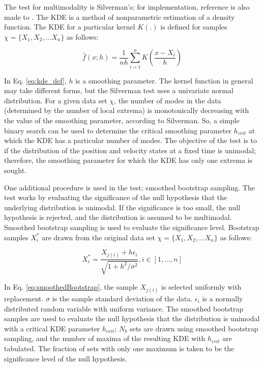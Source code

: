 \documentclass[]{article}
\begin{document}
The test for multimodality is Silverman's\cite{silverman}; for implementation, reference is also made to \cite{adereth}. The KDE is a method of nonparametric estimation of a density function. The KDE for a particular kernel $K(.)$ is defined for samples $\chi = \{ X_1,X_2,...X_n \}$ as follows:

\begin{equation}
\hat{f}(x;h) = \frac{1}{nh} \sum_{i=1}^{n} K(\frac{x-X_i}{h})
\label{eq:kde_def}
\end{equation}

In Eq. \ref{eq:kde_def}, $h$ is a smoothing parameter. The kernel function in general may take different forms, but the Silverman test uses a univariate normal distribution. For a given data set $\chi$, the number of modes in the data (determined by the number of local extrema) is monotonically decreasing with the value of the smoothing parameter, according to Silverman\cite{silverman}. So, a simple binary search can be used to determine the critical smoothing parameter $h_{crit}$ at which the KDE has a particular number of modes. The objective of the test is to if the distribution of the position and velocity states at a fixed time is unimodal; therefore, the smoothing parameter for which the KDE has only one extrema is sought.

One additional procedure is used in the test; smoothed bootstrap sampling. The test works by evaluating the significance of the null hypothesis that the underlying distribution is unimodal. If the significance is too small, the null hypothesis is rejected, and the distribution is assumed to be multimodal. Smoothed bootstrap sampling is used to evaluate the significance level. Bootstrap samples $X_i^*$ are drawn from the original data set $\chi = \{ X_1,X_2,...X_n \}$ as follows:

\begin{equation}
X_i^* = \frac{X_{j(i)} + h\epsilon_i}{\sqrt{1+h^2/\sigma^2}}, i \in [1,\dots,n]
\label{eq:smoothedBootstrap}
\end{equation}

In Eq. \ref{eq:smoothedBootstrap}, the sample $X_{j(i)}$ is selected uniformly with replacement. $\sigma$ is the sample standard deviation of the data. $\epsilon_i$ is a normally distributed random variable with uniform variance. The smoothed bootstrap samples are used to evaluate the null hypothesis that the distribution is unimodal with a critical KDE parameter $h_{crit}$; $N_b$ sets are drawn using smoothed bootstrap sampling, and the number of maxima of the resulting KDE with $h_{crit}$ are tabulated. The fraction of sets with only one maximum is taken to be the significance level of the null hypothesis.
\end{document}
